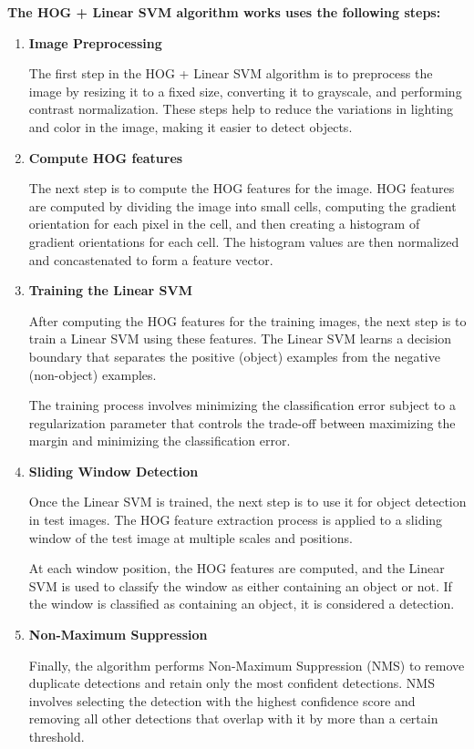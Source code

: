 \textbf{The HOG + Linear SVM algorithm works uses the following steps:}
\begin{enumerate}

    \item \textbf{Image Preprocessing}

          The first step in the HOG + Linear SVM algorithm is to preprocess the image by
          resizing it to a fixed size, converting it to grayscale, and performing
          contrast normalization. These steps help to reduce the variations in lighting
          and color in the image, making it easier to detect objects.

    \item \textbf{Compute HOG features}

          The next step is to compute the HOG features for the image. HOG features are
          computed by dividing the image into small cells, computing the gradient
          orientation for each pixel in the cell, and then creating a histogram of
          gradient orientations for each cell. The histogram values are then normalized
          and concastenated to form a feature vector.

    \item \textbf{Training the Linear SVM}

          After computing the HOG features for the training images, the next step is to
          train a Linear SVM using these features. The Linear SVM learns a decision
          boundary that separates the positive (object) examples from the negative
          (non-object) examples.

          The training process involves minimizing the classification error subject to a
          regularization parameter that controls the trade-off between maximizing the
          margin and minimizing the classification error.

    \item \textbf{Sliding Window Detection}

          Once the Linear SVM is trained, the next step is to use it for object detection
          in test images. The HOG feature extraction process is applied to a sliding
          window of the test image at multiple scales and positions.

          At each window position, the HOG features are computed, and the Linear SVM is
          used to classify the window as either containing an object or not. If the
          window is classified as containing an object, it is considered a detection.

    \item \textbf{Non-Maximum Suppression}

          Finally, the algorithm performs Non-Maximum Suppression (NMS) to remove
          duplicate detections and retain only the most confident detections. NMS
          involves selecting the detection with the highest confidence score and removing
          all other detections that overlap with it by more than a certain threshold.

\end{enumerate}

